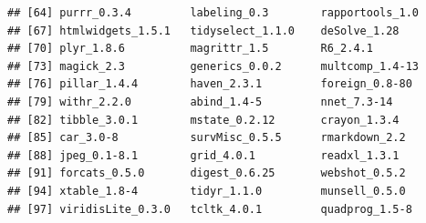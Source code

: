 \documentclass[]{article}
\begin{document}
\begin{verbatim}
## [64] purrr_0.3.4         labeling_0.3        rapportools_1.0    
## [67] htmlwidgets_1.5.1   tidyselect_1.1.0    deSolve_1.28       
## [70] plyr_1.8.6          magrittr_1.5        R6_2.4.1           
## [73] magick_2.3          generics_0.0.2      multcomp_1.4-13    
## [76] pillar_1.4.4        haven_2.3.1         foreign_0.8-80     
## [79] withr_2.2.0         abind_1.4-5         nnet_7.3-14        
## [82] tibble_3.0.1        mstate_0.2.12       crayon_1.3.4       
## [85] car_3.0-8           survMisc_0.5.5      rmarkdown_2.2      
## [88] jpeg_0.1-8.1        grid_4.0.1          readxl_1.3.1       
## [91] forcats_0.5.0       digest_0.6.25       webshot_0.5.2      
## [94] xtable_1.8-4        tidyr_1.1.0         munsell_0.5.0      
## [97] viridisLite_0.3.0   tcltk_4.0.1         quadprog_1.5-8
\end{verbatim}
\end{document}
